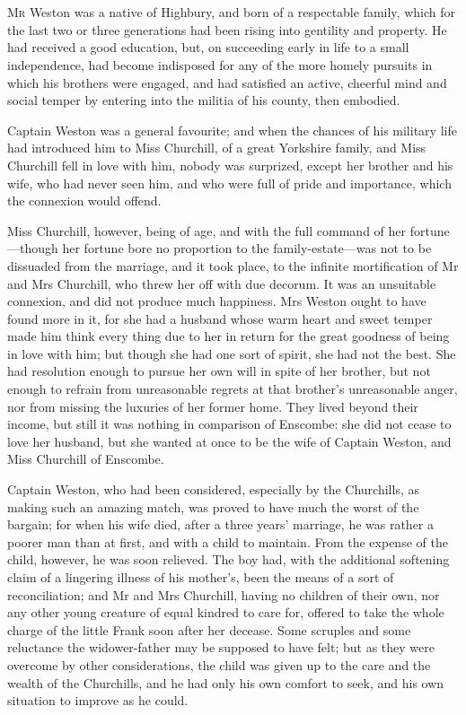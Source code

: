 \chapter[Chapter \thechapter]{}
\lettrine[lraise=0.3]{M}{r} Weston was a native of Highbury, and born of a respectable family, which for the last two or three generations had been rising into gentility and property. He had received a good education, but, on succeeding early in life to a small independence, had become indisposed for any of the more homely pursuits in which his brothers were engaged, and had satisfied an active, cheerful mind and social temper by entering into the militia of his county, then embodied.

Captain Weston was a general favourite; and when the chances of his military life had introduced him to Miss Churchill, of a great Yorkshire family, and Miss Churchill fell in love with him, nobody was surprized, except her brother and his wife, who had never seen him, and who were full of pride and importance, which the connexion would offend.

Miss Churchill, however, being of age, and with the full command of her fortune—though her fortune bore no proportion to the family-estate—was not to be dissuaded from the marriage, and it took place, to the infinite mortification of Mr and Mrs Churchill, who threw her off with due decorum. It was an unsuitable connexion, and did not produce much happiness. Mrs Weston ought to have found more in it, for she had a husband whose warm heart and sweet temper made him think every thing due to her in return for the great goodness of being in love with him; but though she had one sort of spirit, she had not the best. She had resolution enough to pursue her own will in spite of her brother, but not enough to refrain from unreasonable regrets at that brother's unreasonable anger, nor from missing the luxuries of her former home. They lived beyond their income, but still it was nothing in comparison of Enscombe: she did not cease to love her husband, but she wanted at once to be the wife of Captain Weston, and Miss Churchill of Enscombe.

Captain Weston, who had been considered, especially by the Churchills, as making such an amazing match, was proved to have much the worst of the bargain; for when his wife died, after a three years' marriage, he was rather a poorer man than at first, and with a child to maintain. From the expense of the child, however, he was soon relieved. The boy had, with the additional softening claim of a lingering illness of his mother's, been the means of a sort of reconciliation; and Mr and Mrs Churchill, having no children of their own, nor any other young creature of equal kindred to care for, offered to take the whole charge of the little Frank soon after her decease. Some scruples and some reluctance the widower-father may be supposed to have felt; but as they were overcome by other considerations, the child was given up to the care and the wealth of the Churchills, and he had only his own comfort to seek, and his own situation to improve as he could.

